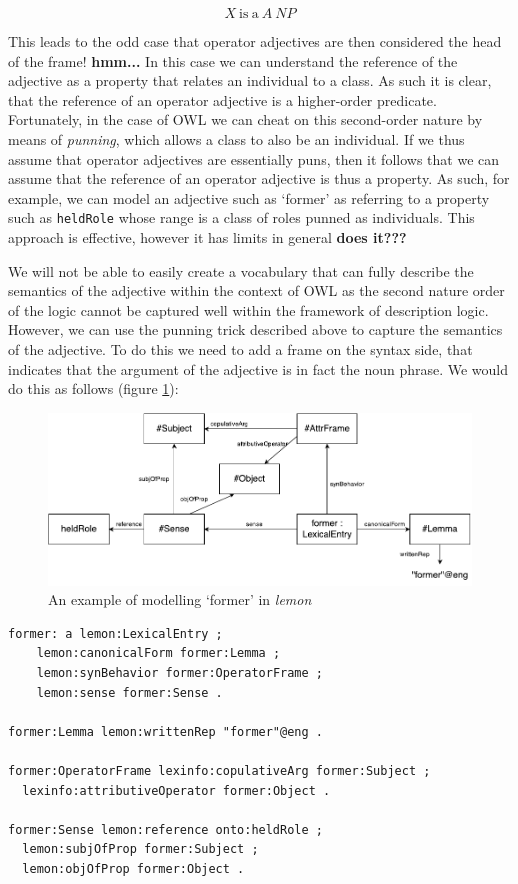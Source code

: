 \documentclass[11pt]{article}
\begin{document}
$$X\mathrm{~is~a~}A~NP$$

This leads to the odd case that operator adjectives are then considered the 
head of the frame! \textbf{hmm...} In this case 
we can understand the reference of the adjective as a property that relates an 
individual to a class. As such it is clear, that the reference of an operator 
adjective is a higher-order predicate. Fortunately, in the case of OWL we can 
cheat on this second-order nature by means of \emph{punning}, which allows a 
class to also be an individual. If we thus assume that operator adjectives are 
essentially puns, then it follows that we can assume that the reference of an 
operator adjective is thus a property. As such, for example, we can model an 
adjective such as `former' as referring to a property such as {\tt heldRole} 
whose range is a class of roles punned as individuals. This approach is 
effective, however it has limits in general \textbf{does it???}

We will not be able to easily create a vocabulary that can fully describe the 
semantics of the adjective within the context of OWL as the second nature order 
of the logic cannot be captured well within the framework of description logic. 
However, we can use the punning trick described above to capture the semantics
of the adjective. To do this we need to add a frame on the syntax side, that 
indicates that the argument of the adjective is in fact the noun phrase. We 
would do this as follows (figure \ref{former-example}):

\begin{figure}
\includegraphics[width=\textwidth]{former-example}
\caption{An example of modelling `former' in \emph{lemon}\label{former-example}}
\end{figure}

\begin{verbatim}
former: a lemon:LexicalEntry ;
	lemon:canonicalForm former:Lemma ;
	lemon:synBehavior former:OperatorFrame ;
	lemon:sense former:Sense .

former:Lemma lemon:writtenRep "former"@eng .

former:OperatorFrame lexinfo:copulativeArg former:Subject ;
  lexinfo:attributiveOperator former:Object .
  
former:Sense lemon:reference onto:heldRole ;
  lemon:subjOfProp former:Subject ;
  lemon:objOfProp former:Object .
\end{verbatim}
\end{document}
